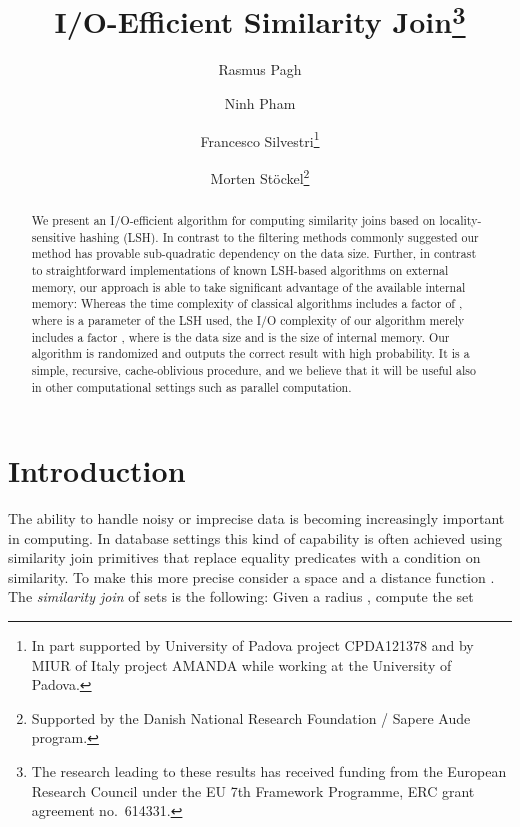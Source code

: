 \documentclass{llncs}
\begin{document}
\title{I/O-Efficient Similarity Join\thanks{The research leading to these results has received
funding from the European Research Council under the EU 7th Framework Programme, ERC grant agreement no.~614331.}}
\date{}

\author{Rasmus Pagh \and Ninh Pham \and Francesco Silvestri\thanks{In part supported by University of Padova project CPDA121378 and by MIUR of Italy project AMANDA while working at the University of Padova.} \and Morten St{\"o}ckel\thanks{Supported by the Danish National Research Foundation / Sapere Aude program.}}


\maketitle



\begin{abstract}

We present an I/O-efficient algorithm for computing similarity joins based on locality-sensitive hashing (LSH).
In contrast to the filtering methods commonly suggested our method has provable sub-quadratic dependency on the data size.
Further, in contrast to straightforward implementations of known LSH-based algorithms on external memory, our approach is able to take significant advantage of the available internal memory: Whereas the time complexity of classical algorithms includes a factor of , where  is a parameter of the LSH used, the I/O complexity of our algorithm merely includes a factor , where  is the data size and  is the size of internal memory. 
Our algorithm is randomized and outputs the correct result with high probability.
It is a simple, recursive, cache-oblivious procedure, and we believe that it will be useful also in other computational settings such as parallel computation.

\end{abstract}




\section{Introduction}

The ability to handle noisy or imprecise data is becoming increasingly important in computing.
In database settings this kind of capability is often achieved using similarity join primitives that replace equality predicates with a condition on similarity.
To make this more precise consider a space  and a distance function .
The {\em similarity join\/} of sets  is the following:
Given a radius , compute the set 
\end{document}
